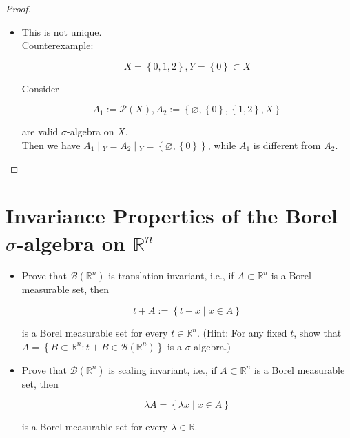 \begin{proof}
\begin{itemize}
\begin{enumerate}
    \[\left( {\bigcup\limits_{n = 1}^{\infty}E_{n}} \right) \cap Y = \bigcup\limits_{n = 1}^{\infty}(E_{n} \cap Y) \in \mathcal{B},\]

    since \(\mathcal{B}\) is a \(\sigma\)-algebra on \(Y\). Therefore, \(\bigcup_{n = 1}^{\infty}E_{n} \in \mathcal{A}\).
  \end{enumerate}
\item
  This is not unique.\\
  Counterexample:

  \[X = \left\{ {0,1,2} \right\},Y = \left\{ 0 \right\} \subset X\]

  Consider

  \[A_{1} := \mathcal{P}(X),A_{2} := \left\{ {\varnothing,\left\{ 0 \right\},\left\{ {1,2} \right\},X} \right\}\]

  are valid \(\sigma\)-algebra on \(X\).\\
  Then we have \(\left. A_{1} \middle| {}_{Y} = A_{2} \middle| {}_{Y} = \left\{ {\varnothing,\left\{ 0 \right\}} \right\} \right.\), while \(A_{1}\) is different from \(A_{2}\).
\end{itemize}

\end{proof}

\section{\texorpdfstring{Invariance Properties of the Borel \(\sigma\)-algebra on \(\mathbb{R}^{n}\)}{Invariance Properties of the Borel \textbackslash sigma-algebra on \textbackslash mathbb\{R\}\^{}\{n\}}}\label{invariance-properties-of-the-borel-sigma-algebra-on-mathbbrn}

\begin{itemize}
\item
  Prove that \(\mathcal{B}(\mathbb{R}^{n})\) is translation invariant, i.e., if \(A \subset \mathbb{R}^{n}\) is a Borel measurable set, then

  \[t + A := \left\{ {t + x \mid x \in A} \right\}\]

  is a Borel measurable set for every \(t \in \mathbb{R}^{n}\). (Hint: For any fixed \(t\), show that \(A = \left\{ {B \subset \mathbb{R}^{n}:t + B \in \mathcal{B}(\mathbb{R}^{n})} \right\}\) is a \(\sigma\)-algebra.)
\item
  Prove that \(\mathcal{B}(\mathbb{R}^{n})\) is scaling invariant, i.e., if \(A \subset \mathbb{R}^{n}\) is a Borel measurable set, then

  \[\lambda A = \left\{ {\lambda x \mid x \in A} \right\}\]

  is a Borel measurable set for every \(\lambda \in \mathbb{R}\).
\end{itemize}

